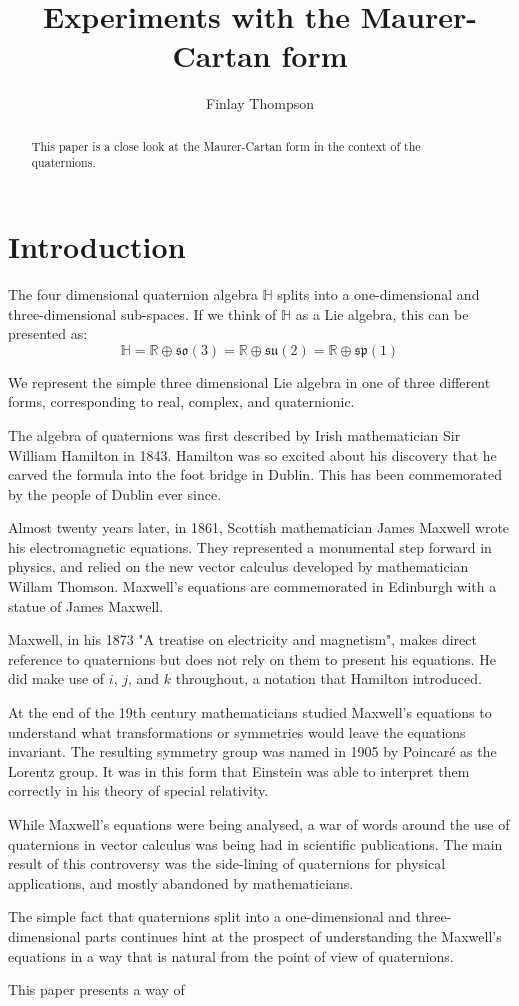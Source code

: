 \documentclass{amsart}
\title{Experiments with the Maurer-Cartan form}
\author{Finlay Thompson}
\newcommand{\HH}{\mathbb{H}}
\newcommand{\RR}{\mathbb{R}}
\newcommand{\so}{\mathfrak{so}}
\newcommand{\su}{\mathfrak{su}}
\renewcommand{\sp}{\mathfrak{sp}}
\begin{document}
\begin{abstract}
  This paper is a close look at the Maurer-Cartan form in the context of the quaternions.
\end{abstract}

\maketitle

\section{Introduction}

The four dimensional quaternion algebra $\HH$ splits into a one-dimensional and three-dimensional sub-spaces.
If we think of $\HH$ as a Lie algebra, this can be presented as:
$$\HH = \RR \oplus \so(3) = \RR \oplus \su(2) = \RR \oplus \sp(1) $$

We represent the simple three dimensional Lie algebra in one of three different forms, corresponding to real, complex, and quaternionic.

The algebra of quaternions was first described by Irish mathematician Sir William Hamilton in 1843.
Hamilton was so excited about his discovery that he carved the formula into the foot bridge in Dublin.
This has been commemorated by the people of Dublin ever since.

Almost twenty years later, in 1861, Scottish mathematician James Maxwell wrote his electromagnetic equations.
They represented a monumental step forward in physics, and relied on the new vector calculus developed by mathematician Willam Thomson.
Maxwell's equations are commemorated in Edinburgh with a statue of James Maxwell.

Maxwell, in his 1873 "A treatise on electricity and magnetism", makes direct reference to quaternions but does not rely on them to present his equations.
He did make use of $i$, $j$, and $k$ throughout, a notation that Hamilton introduced.

At the end of the 19th century mathematicians studied Maxwell's equations to understand what transformations or symmetries would leave the equations invariant.
The resulting symmetry group was named in 1905 by Poincaré as the Lorentz group.
It was in this form that Einstein was able to interpret them correctly in his theory of special relativity.

While Maxwell's equations were being analysed, a war of words around the use of quaternions in vector calculus was being had in scientific publications.
The main result of this controversy was the side-lining of quaternions for physical applications, and mostly abandoned by mathematicians.

The simple fact that quaternions split into a one-dimensional and three-dimensional parts continues hint at the prospect of understanding the Maxwell's equations in a way that is natural from the point of view of quaternions.

This paper presents a way of
\end{document}
